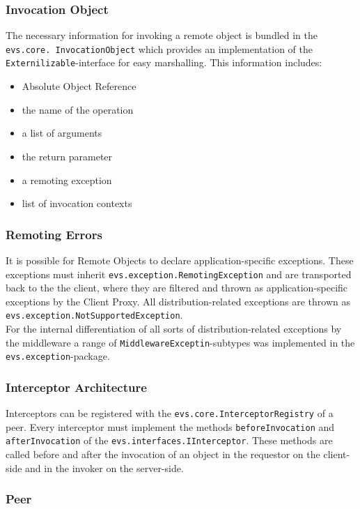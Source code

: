 \subsubsection{Invocation Object}
The necessary information for invoking a remote object is bundled in the \texttt{evs.core. InvocationObject} which provides an implementation of the \texttt{Externilizable}-interface for easy marshalling. This information includes:
\begin{itemize}\itemsep0pt
\item Absolute Object Reference
\item the name of the operation
\item a list of arguments
\item the return parameter
\item a remoting exception
\item list of invocation contexts
\end{itemize}

\subsubsection{Remoting Errors}
It is possible for Remote Objects to declare application-specific exceptions. These exceptions must inherit \texttt{evs.exception.RemotingException} and are transported back to the the client, where they are filtered and thrown as application-specific exceptions by the Client Proxy. All distribution-related exceptions are thrown as \texttt{evs.exception.NotSupportedException}.\\For the internal differentiation of all sorts of distribution-related exceptions by the middleware a range of \texttt{MiddlewareExceptin}-subtypes was implemented in the \texttt{evs.exception}-package.

\subsubsection{Interceptor Architecture}
Interceptors can be registered with the \texttt{evs.core.InterceptorRegistry} of a peer. Every interceptor must implement the methods \texttt{beforeInvocation} and \texttt{afterInvocation} of the \texttt{evs.interfaces.IInterceptor}. These methods are called before and after the invocation of an object in the requestor on the client-side and in the invoker on the server-side.

\subsubsection{Peer}

